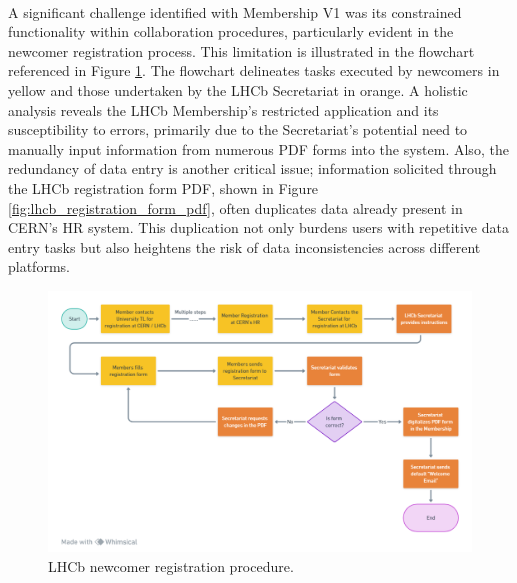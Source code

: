 \paragraph{} A significant challenge identified with Membership V1 was its constrained functionality within collaboration procedures, particularly evident in the newcomer registration process. This limitation is illustrated in the flowchart referenced in Figure \ref{fig:registration_old}. The flowchart delineates tasks executed by newcomers in yellow and those undertaken by the LHCb Secretariat in orange. A holistic analysis reveals the LHCb Membership's restricted application and its susceptibility to errors, primarily due to the Secretariat's potential need to manually input information from numerous PDF forms into the system. Also, the redundancy of data entry is another critical issue; information solicited through the LHCb registration form PDF, shown in Figure \ref{fig:lhcb_registration_form_pdf}, often duplicates data already present in CERN's HR system. This duplication not only burdens users with repetitive data entry tasks but also heightens the risk of data inconsistencies across different platforms.

\begin{figure}[H]
    \centering
    \includegraphics[width=1\linewidth]{figuras/newcomer_wf.png}
    \caption{LHCb newcomer registration procedure.}
    \label{fig:registration_old}
\end{figure}

